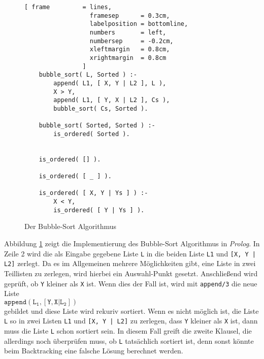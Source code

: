 \begin{figure}[!h]
  \centering
\begin{Verbatim}[ frame         = lines, 
                  framesep      = 0.3cm, 
                  labelposition = bottomline,
                  numbers       = left,
                  numbersep     = -0.2cm,
                  xleftmargin   = 0.8cm,
                  xrightmargin  = 0.8cm
                ]
    bubble_sort( L, Sorted ) :-
        append( L1, [ X, Y | L2 ], L ),
        X > Y,
        append( L1, [ Y, X | L2 ], Cs ),
        bubble_sort( Cs, Sorted ).
    
    bubble_sort( Sorted, Sorted ) :-
        is_ordered( Sorted ).
    
    
    is_ordered( [] ).
    
    is_ordered( [ _ ] ).
    
    is_ordered( [ X, Y | Ys ] ) :-
        X < Y,
        is_ordered( [ Y | Ys ] ).
\end{Verbatim}
\vspace*{-0.3cm}
  \caption{Der Bubble-Sort Algorithmus}
  \label{fig:bubble_sort}
\end{figure}

Abbildung \ref{fig:bubble_sort} zeigt die Implementierung des Bubble-Sort Algorithmus in
\textsl{Prolog}.  In Zeile 2 wird die als Eingabe gegebene Liste \texttt{L} in die beiden
Liste \texttt{L1} und \texttt{[X, Y | L2]} zerlegt.  Da es im Allgemeinen mehrere
Möglichkeiten gibt,  eine Liste in zwei Teillisten zu zerlegen, wird hierbei ein
Auswahl-Punkt gesetzt.  Anschließend wird geprüft, ob \texttt{Y} kleiner als \texttt{X}
ist.  Wenn dies der Fall ist, wird mit \texttt{append/3} die neue Liste 
\\[0.1cm]
\hspace*{1.3cm} $\mathtt{append(L_1, [Y,X|L_2])}$ \\[0.1cm]
gebildet und diese Liste wird rekuriv sortiert.  Wenn es nicht möglich ist,
die Liste \texttt{L} so in zwei Listen \texttt{L1} und \texttt{[X, Y | L2]} zu zerlegen,
dass \texttt{Y} kleiner als \texttt{X} ist, dann muss die Liste \texttt{L} schon sortiert
sein.  In diesem Fall greift die zweite Klausel, die allerdings noch überprüfen muss, ob
\texttt{L} tatsächlich sortiert ist, denn sonst könnte beim Backtracking eine falsche
Lösung berechnet werden.

